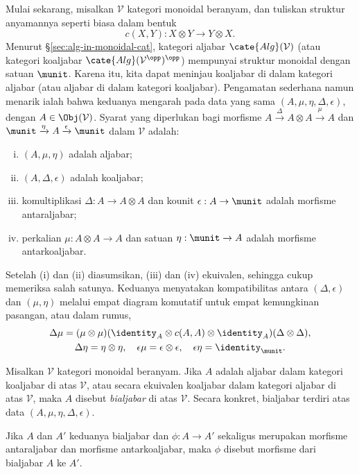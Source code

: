 Mulai sekarang, misalkan $\mathcal{V}$ kategori monoidal beranyam, dan
tuliskan struktur anyamannya seperti biasa dalam bentuk
\[ c(X, Y): X \otimes Y \to Y \otimes X. \]
Menurut \S\ref{sec:alg-in-monoidal-cat}, kategori aljabar
$\cate{Alg}(\mathcal{V})$ (atau kategori koaljabar
$\cate{Alg}(\mathcal{V}^{\opp})^{\opp}$) mempunyai struktur monoidal dengan
satuan $\munit$. Karena itu, kita dapat meninjau koaljabar di dalam kategori
aljabar (atau aljabar di dalam kategori koaljabar). Pengamatan sederhana
namun menarik ialah bahwa keduanya mengarah pada data yang sama
$(A,\mu,\eta,\Delta,\epsilon)$, dengan $A\in\Obj(\mathcal{V})$. Syarat yang
diperlukan bagi morfisme
$A\xrightarrow{\Delta}A\otimes A\xrightarrow{\mu}A$ dan
$\munit\xrightarrow{\eta}A\xrightarrow{\epsilon}\munit$ dalam
$\mathcal{V}$ adalah:
\begin{enumerate}[(i)]
	\item $(A,\mu,\eta)$ adalah aljabar;
	\item $(A,\Delta,\epsilon)$ adalah koaljabar;
	\item komultiplikasi $\Delta:A\to A\otimes A$ dan kounit
	$\epsilon:A\to\munit$ adalah morfisme antaraljabar;
	\item perkalian $\mu:A\otimes A\to A$ dan satuan
	$\eta:\munit\to A$ adalah morfisme antarkoaljabar.
\end{enumerate}
Setelah (i) dan (ii) diasumsikan, (iii) dan (iv) ekuivalen, sehingga cukup
memeriksa salah satunya. Keduanya menyatakan kompatibilitas antara
$(\Delta,\epsilon)$ dan $(\mu,\eta)$ melalui empat diagram komutatif untuk
empat kemungkinan pasangan, atau dalam rumus,
\begin{equation*}\begin{gathered}
	\Delta \mu = (\mu \otimes \mu)(\identity_A \otimes c(A, A) \otimes \identity_A) (\Delta \otimes \Delta), \\
	\Delta \eta = \eta \otimes \eta, \quad \epsilon \mu = \epsilon \otimes \epsilon, \quad \epsilon \eta = \identity_{\munit}.
\end{gathered}\end{equation*}

\begin{definition}[Bialjabar]
	Misalkan $\mathcal{V}$ kategori monoidal beranyam. Jika $A$ adalah
	aljabar dalam kategori koaljabar di atas $\mathcal{V}$, atau secara
	ekuivalen koaljabar dalam kategori aljabar di atas $\mathcal{V}$, maka $A$
	disebut \emph{bialjabar} di atas $\mathcal{V}$. Secara konkret, bialjabar
	terdiri atas data $(A,\mu,\eta,\Delta,\epsilon)$.

	Jika $A$ dan $A'$ keduanya bialjabar dan $\phi:A\to A'$ sekaligus
	merupakan morfisme antaraljabar dan morfisme antarkoaljabar, maka $\phi$
	disebut morfisme dari bialjabar $A$ ke $A'$.
\end{definition}

